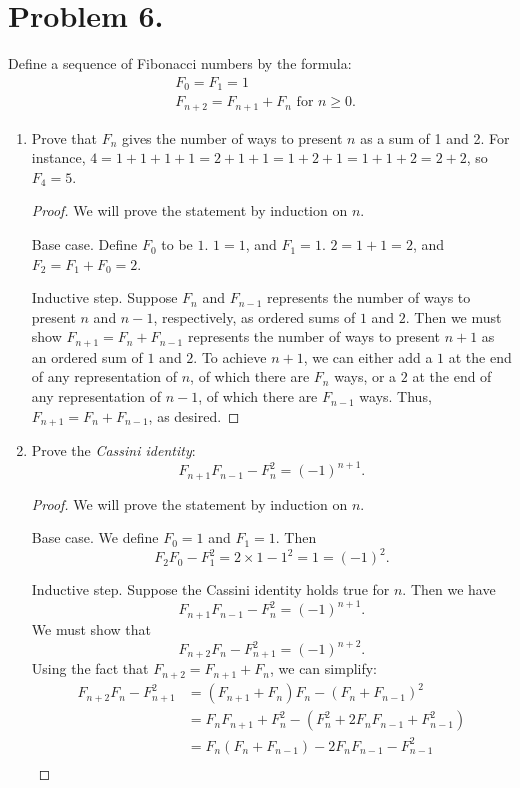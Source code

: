 \documentclass{article}
\begin{document}
\section{Problem 6.}
Define a sequence of Fibonacci numbers by the formula:
\begin{align*}
    &F_0=F_1=1\\
    &F_{n+2}=F_{n+1}+F_{n} \text{ for } n\geq 0.
\end{align*}
\begin{enumerate}[label=(\alph*)]
    \item Prove that $F_n$ gives the number of ways to present $n$ as a sum of 1 and 2. For instance, $4=1+1+1+1=2+1+1=1+2+1=1+1+2=2+2$, so $F_4=5$.
    \label{6(a)}
    \begin{proof}
    We will prove the statement by induction on $n$.
    \par Base case. Define $F_0$ to be $1$. $1=1$, and $F_1=1$. $2=1+1=2$, and $F_2=F_1+F_0=2$.
    \par Inductive step. Suppose $F_n$ and $F_{n-1}$ represents the number of ways to present $n$ and $n-1$, respectively, as ordered sums of $1$ and $2$. Then we must show $F_{n+1}=F_n+F_{n-1}$ represents the number of ways to present $n+1$ as an ordered sum of $1$ and $2$. To achieve $n+1$, we can either add a $1$ at the end of any representation of $n$, of which there are $F_n$ ways, or a $2$ at the end of any representation of $n-1$, of which there are $F_{n-1}$ ways. Thus, $F_{n+1}=F_n+F_{n-1}$, as desired.
    \end{proof}
    \item Prove the \textit{Cassini identity}:
    \[F_{n+1}F_{n-1}-F_n^2=(-1)^{n+1}.\]
    \begin{proof}
    We will prove the statement by induction on $n$.
    \par Base case. We define $F_0=1$ and $F_1=1$. Then 
    \[F_2F_0-F_1^2=2\times 1-1^2=1=(-1)^2.\]
    \par Inductive step. Suppose the Cassini identity holds true for $n$. Then we have
    \[F_{n+1}F_{n-1}-F_n^2=(-1)^{n+1}.\]
    We must show that 
    \[F_{n+2}F_n-F_{n+1}^2=(-1)^{n+2}.\]
    Using the fact that $F_{n+2}=F_{n+1}+F_{n}$, we can simplify:
    \begin{align*}
        F_{n+2}F_n-F_{n+1}^2&=(F_{n+1}+F_n)F_n-(F_n+F_{n-1})^2\\
        &=F_nF_{n+1}+F_n^2-(F_n^2+2F_nF_{n-1}+F_{n-1}^2)\\
        &=F_n(F_n+F_{n-1})-2F_nF_{n-1}-F_{n-1}^2\\

\end{align*}
\end{proof}
\end{enumerate}
\end{document}
